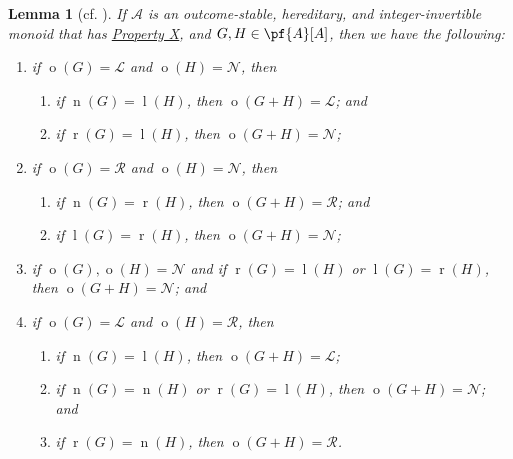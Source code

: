 \documentclass[11pt]{article}
\newtheorem{lemma}[theorem]{Lemma}
\theoremstyle{definition}
\DeclareMathOperator{\outcome}{o}
\newcommand{\set}[1]{\mathcal{#1}}
\DeclareMathOperator{\ltp}{l}
\DeclareMathOperator{\ntp}{n}
\DeclareMathOperator{\rtp}{r}
\begin{document}
\begin{lemma}[cf. {\cite[Theorem 15 on pp.~8--9]{milley.renault:invertible}}]
    \label{thm:final-piece}
    If $\set{A}$ is an outcome-stable, hereditary, and integer-invertible
    monoid that has \hyperlink{prop:X}{Property X}, and $G,H\in\pf{A}[A]$, then
    we have the following:
    \begin{enumerate}
        \item
            if $\outcome(G)=\mathscr{L}$ and $\outcome(H)=\mathscr{N}$, then
            \begin{enumerate}
                \item
                    if $\ntp(G)=\ltp(H)$, then $\outcome(G+H)=\mathscr{L}$; and
                \item
                    if $\rtp(G)=\ltp(H)$, then $\outcome(G+H)=\mathscr{N}$;
            \end{enumerate}
        \item 
            if $\outcome(G)=\mathscr{R}$ and $\outcome(H)=\mathscr{N}$, then
            \begin{enumerate}
                \item
                    if $\ntp(G)=\rtp(H)$, then $\outcome(G+H)=\mathscr{R}$; and
                \item
                    if $\ltp(G)=\rtp(H)$, then $\outcome(G+H)=\mathscr{N}$;
            \end{enumerate}
        \item
            if $\outcome(G),\outcome(H)=\mathscr{N}$ and if $\rtp(G)=\ltp(H)$
            or $\ltp(G)=\rtp(H)$, then $\outcome(G+H)=\mathscr{N}$; and
        \item
            if $\outcome(G)=\mathscr{L}$ and $\outcome(H)=\mathscr{R}$, then
            \begin{enumerate}
                \item
                    if $\ntp(G)=\ltp(H)$, then $\outcome(G+H)=\mathscr{L}$;
                \item
                    if $\ntp(G)=\ntp(H)$ or $\rtp(G)=\ltp(H)$, then
                    $\outcome(G+H)=\mathscr{N}$; and
                \item
                    if $\rtp(G)=\ntp(H)$, then $\outcome(G+H)=\mathscr{R}$.
            \end{enumerate}
    \end{enumerate}
\end{lemma}
\end{document}
